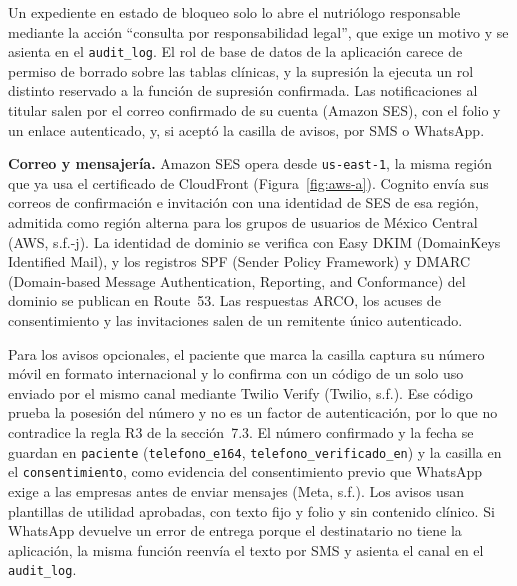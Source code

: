 \documentclass[12pt, a4paper]{article}
\begin{document}
Un expediente en estado de bloqueo solo lo abre el nutriólogo
responsable mediante la acción ``consulta por responsabilidad legal'', que
exige un motivo y se asienta en el \texttt{audit\_log}. El rol de base
de datos de la aplicación carece de permiso de borrado sobre las tablas
clínicas, y la supresión la ejecuta un rol distinto reservado a la
función de supresión confirmada. Las notificaciones al titular salen por
el correo confirmado de su cuenta (Amazon SES), con el folio y un enlace autenticado, y, si aceptó la casilla
de avisos, por SMS o WhatsApp.
 
\textbf{Correo y mensajería.} Amazon SES opera desde \texttt{us-east-1},
la misma región que ya usa el certificado de CloudFront
(Figura~\ref{fig:aws-a}). Cognito envía sus correos de confirmación e
invitación con una identidad de SES de esa región, admitida como región
alterna para los grupos de usuarios de México Central (AWS, s.f.-j). La
identidad de dominio se verifica con Easy DKIM (DomainKeys Identified Mail), y los registros SPF (Sender Policy Framework) y
DMARC (Domain-based Message Authentication, Reporting, and Conformance) del dominio se publican en Route~53. Las respuestas ARCO, los
acuses de consentimiento y las invitaciones salen de un remitente único
autenticado.

Para los avisos opcionales, el paciente que marca la casilla captura su
número móvil en formato internacional y lo confirma con un código de un
solo uso enviado por el mismo canal mediante Twilio Verify (Twilio,
s.f.). Ese código prueba la posesión del número y no es un factor de
autenticación, por lo que no contradice la regla R3 de la sección~7.3.
El número confirmado y la fecha se guardan en \texttt{paciente}
(\texttt{telefono\_e164}, \texttt{telefono\_verificado\_en}) y la
casilla en el \texttt{consentimiento}, como evidencia del consentimiento
previo que WhatsApp exige a las empresas antes de enviar mensajes (Meta,
s.f.). Los avisos usan plantillas de utilidad aprobadas, con texto fijo
y folio y sin contenido clínico. Si WhatsApp devuelve un error de
entrega porque el destinatario no tiene la aplicación, la misma función
reenvía el texto por SMS y asienta el canal en el \texttt{audit\_log}.
 
\end{document}
